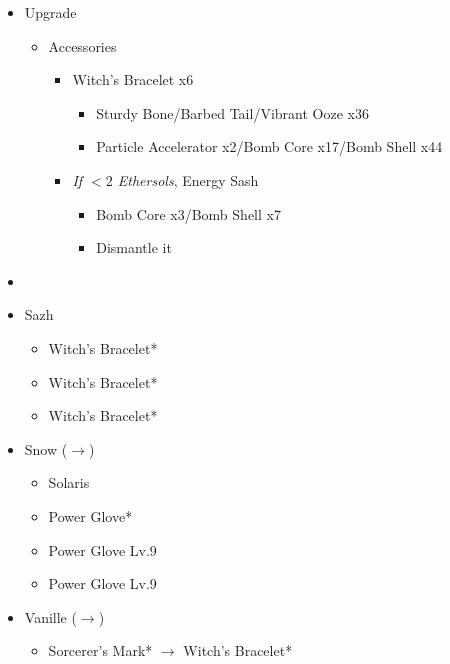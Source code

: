 \begin{upgrade}
	\begin{itemize}
		\item Upgrade
			\begin{itemize}
				\item Accessories
					\begin{itemize}
						\item Witch's Bracelet x6
							\begin{itemize}
								\item Sturdy Bone/Barbed Tail/Vibrant Ooze x36
								\item Particle Accelerator x2/Bomb Core x17/Bomb Shell x44
							\end{itemize}
						\item \textit{If $<2$ Ethersols}, Energy Sash
							\begin{itemize}
								\item Bomb Core x3/Bomb Shell x7
								\item Dismantle it
							\end{itemize}
					\end{itemize}
			\end{itemize}
	\end{itemize}
\end{upgrade}

\begin{menu}
	\begin{itemize}
	\paradigm
		\begin{itemize}
			\item {}%
				{\paradigmline{\com}{(\rav)}{(\rav)}}%
				{\paradigmline{\com}{(\rav)}{\med}}%
				{\paradigmline{(\rav)}{(\sen)}{(\med)}}%
				{\paradigmline[4]{\com}{\sen}{\med}}%
				{\paradigmline{\syn}{\sen}{\med}}%
				{\paradigmline{\rav}{\rav}{\sab}}%
		\end{itemize}
	\equip
		\begin{itemize}
			\item Sazh
				\begin{itemize}
					\item Witch's Bracelet*
					\item Witch's Bracelet*
					\item Witch's Bracelet*
				\end{itemize}
			\item Snow ($\rightarrow$)
				\begin{itemize}
					\item Solaris
					\item Power Glove*
					\item Power Glove Lv.9
					\item Power Glove Lv.9
				\end{itemize}
			\item Vanille ($\rightarrow$)
				\begin{itemize}
					\item Sorcerer's Mark* $\rightarrow$ Witch's Bracelet*
				\end{itemize}
		\end{itemize}
	\end{itemize}
\end{menu}

